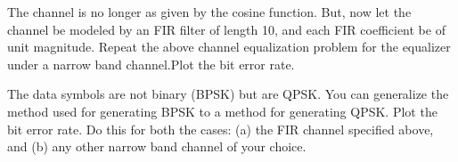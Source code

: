 \documentclass[journal,12pt,twocolumn]{IEEEtran}
\begin{document}
\begin{problem}

The channel is no longer as given by the cosine function. But, now let the channel be modeled by an FIR filter of length 10, and each FIR coefficient be of unit magnitude. Repeat the above channel equalization problem for the equalizer under a narrow band channel.Plot the bit error rate.
\end{problem}
\begin{problem}
The data symbols are not binary (BPSK) but are QPSK. You can generalize the method used for generating BPSK to a method for generating QPSK. Plot the bit error rate. Do this for both the cases: (a) the FIR channel specified above, and (b) any other narrow band channel of your choice.
\end{problem}
\end{document}
